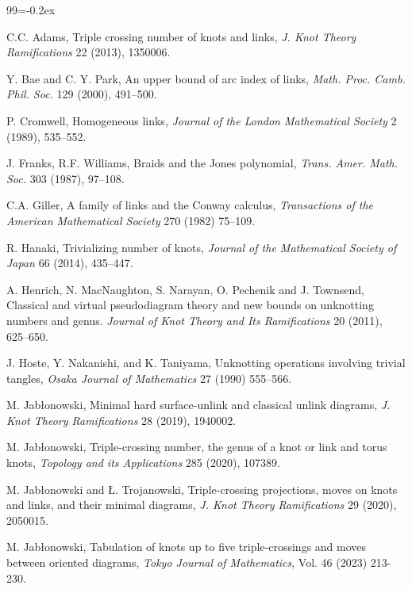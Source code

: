 \documentclass[pdftex, a4paper, 12pt, oneside]{amsart}
\numberwithin{equation}{section}
\theoremstyle{plain}
\theoremstyle{definition}
\begin{document}
	
	\begin{thebibliography}{99}\itemsep=-0.2ex

		
		
			 C.C. Adams, Triple crossing number of knots and links, \emph{J. Knot Theory Ramifications} 22 (2013), 1350006.
		
		 Y. Bae and C. Y. Park, An upper bound of arc index of links, \emph{Math. Proc. Camb. Phil. Soc.} 129 (2000), 491--500.
		
		 P. Cromwell, Homogeneous links, \emph{Journal of the London Mathematical Society} 2 (1989), 535--552.
		
		 J. Franks, R.F. Williams, Braids and the Jones polynomial, \emph{Trans. Amer. Math. Soc.} 303 (1987), 97--108.
		
		 C.A. Giller, A family of links and the Conway calculus, \emph{Transactions of the American Mathematical Society} 270 (1982) 75--109.
		
		 R. Hanaki, Trivializing number of knots, \emph{Journal of the Mathematical Society of Japan} 66 (2014), 435--447.
		
		 A. Henrich, N. MacNaughton, S. Narayan, O. Pechenik and J. Townsend, Classical and virtual pseudodiagram theory and new bounds on unknotting numbers and genus. \emph{Journal of Knot Theory and Its Ramifications} 20 (2011), 625--650.
		
		 J. Hoste, Y. Nakanishi, and K. Taniyama, Unknotting operations involving trivial tangles, \emph{Osaka Journal of Mathematics} 27 (1990) 555--566.
	
		 M. Jab\l onowski, Minimal hard surface-unlink and classical unlink diagrams, \emph{J. Knot Theory Ramifications} 28 (2019), 1940002.
		
		 M. Jab\l onowski, Triple-crossing number, the genus of a knot or link and torus knots, \emph{Topology and its Applications} 285 (2020), 107389.
		
		 M. Jab\l onowski and \L. Trojanowski, Triple-crossing projections, moves on knots and links, and their minimal diagrams, \emph{J. Knot Theory Ramifications} 29 (2020), 2050015.
		
		 M. Jab\l onowski, Tabulation of knots up to five triple-crossings and moves between oriented diagrams, \emph{Tokyo Journal of Mathematics}, Vol. 46 (2023) 213-230.
		

\end{thebibliography}
\end{document}
